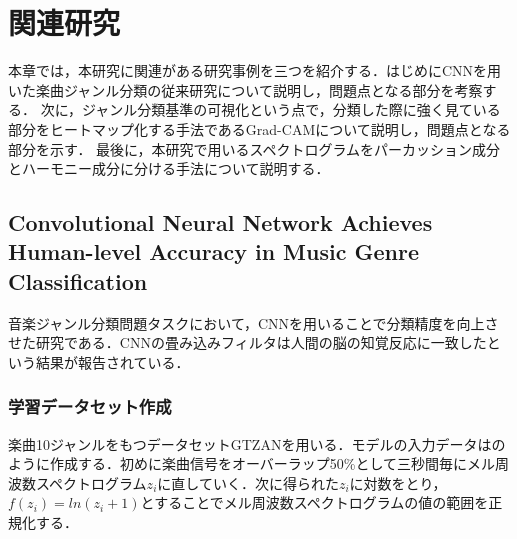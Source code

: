 \chapter{関連研究}\label{old-study}
本章では，本研究に関連がある研究事例を三つを紹介する．はじめにCNNを用いた楽曲ジャンル分類の従来研究について説明し，問題点となる部分を考察する．
次に，ジャンル分類基準の可視化という点で，分類した際に強く見ている部分をヒートマップ化する手法であるGrad-CAMについて説明し，問題点となる部分を示す．
最後に，本研究で用いるスペクトログラムをパーカッション成分とハーモニー成分に分ける手法について説明する．


\section{Convolutional Neural Network Achieves Human-level Accuracy in Music Genre Classification}
音楽ジャンル分類問題タスクにおいて，CNNを用いることで分類精度を向上させた研究である．CNNの畳み込みフィルタは人間の脳の知覚反応に一致したという結果が報告されている\cite{Mingwen}．

\subsection{学習データセット作成}
楽曲10ジャンルをもつデータセットGTZANを用いる\cite{gtzan}．モデルの入力データはのように作成する．初めに楽曲信号をオーバーラップ50\%として三秒間毎にメル周波数スペクトログラム$z_i$に直していく．次に得られた$z_i$に対数をとり，$f(z_i) = ln(z_i + 1)$とすることでメル周波数スペクトログラムの値の範囲を正規化する．
